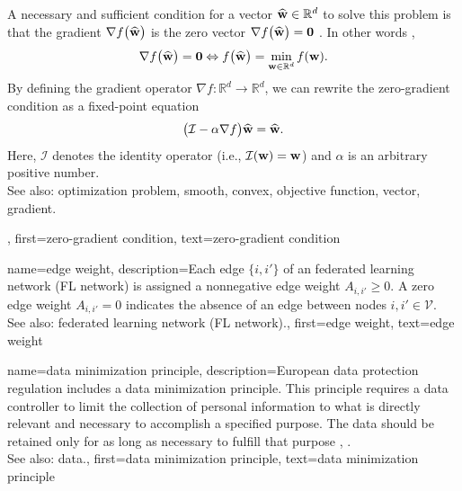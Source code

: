 {{{\begin{figure}[htbp]
			\end{figure}
			A necessary and sufficient condition for a vector $\widehat{{\bf w}} \in \mathbb{R}^{d}$ 
			to solve this problem is that the gradient $\nabla f \big( \widehat{{\bf w}} \big)$ 
			is the zero vector $\nabla f \big( \widehat{{\bf w}} \big) = \mathbf{0}$ . In other words \cite[p. 140]{BoydConvexBook}, 
			$$\nabla f \big( \widehat{{\bf w}} \big) = \mathbf{0} \Leftrightarrow  f \big( \widehat{{\bf w}} \big) = \min_{{\bf w} \in \mathbb{R}^{d}} f({\bf w}).$$ 
			By defining the gradient operator $\nabla f: \mathbb{R}^{d} \rightarrow \mathbb{R}^{d}$, we 
			can rewrite the zero-gradient condition as a fixed-point equation
			$$ \big( \mathcal{I} - \alpha \nabla f\big) \widehat{{\bf w}} = \widehat{{\bf w}}.$$ 
			Here, $\mathcal{I}$ denotes the identity operator (i.e., $\mathcal{I}({\bf w}) = {\bf w}$) 
			and $\alpha$ is an arbitrary positive number. 
					\\
			See also: optimization problem, smooth, convex, objective function, vector, gradient.}, 
		first={zero-gradient condition},
		text={zero-gradient condition}
}


{name={edge weight},
	description={Each edge $\{i,i'\}$ of an federated learning network (FL network) is 
		assigned a nonnegative edge weight $A_{i,i'}\geq0$. 
		A zero edge weight $A_{i,i'}=0$ indicates the absence 
		of an edge between nodes $i, i' \in \mathcal{V}$.
				\\
		See also: federated learning network (FL network).}, 
	first={edge weight},
	text={edge weight}
}


{name={data minimization principle},
	description={European data protection regulation 
		includes a data minimization principle. This principle requires a data controller to 
		limit the collection of personal information to what is directly relevant and necessary 
		to accomplish a specified purpose. The data should be retained only for as long as 
		necessary to fulfill that purpose \cite[Article 5(1)(c)]{GDPR2016}, \cite{EURegulation2018}.
				\\
		See also: data.}, 
	first={data minimization principle},
	text={data minimization principle}
}

}
